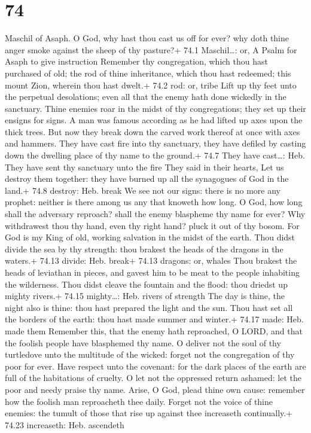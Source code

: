 \hypertarget{section-73}{%
\section{74}\label{section-73}}

Maschil of Asaph.  O God, why hast thou cast us off for
ever? why doth thine anger smoke against the sheep of thy pasture?+ 74.1
Maschil\ldots: or, A Psalm for Asaph to give instruction 
Remember thy congregation, which thou hast purchased of old; the rod of
thine inheritance, which thou hast redeemed; this mount Zion, wherein
thou hast dwelt.+ 74.2 rod: or, tribe  Lift up thy feet unto
the perpetual desolations; even all that the enemy hath done wickedly in
the sanctuary.  Thine enemies roar in the midst of thy
congregations; they set up their ensigns for signs.  A man
was famous according as he had lifted up axes upon the thick trees.
 But now they break down the carved work thereof at once
with axes and hammers.  They have cast fire into thy
sanctuary, they have defiled by casting down the dwelling place of thy
name to the ground.+ 74.7 They have cast\ldots: Heb. They have sent thy
sanctuary unto the fire  They said in their hearts, Let us
destroy them together: they have burned up all the synagogues of God in
the land.+ 74.8 destroy: Heb. break  We see not our signs:
there is no more any prophet: neither is there among us any that knoweth
how long.  O God, how long shall the adversary reproach?
shall the enemy blaspheme thy name for ever?  Why
withdrawest thou thy hand, even thy right hand? pluck it out of thy
bosom.  For God is my King of old, working salvation in the
midst of the earth.  Thou didst divide the sea by thy
strength: thou brakest the heads of the dragons in the waters.+ 74.13
divide: Heb. break+ 74.13 dragons: or, whales  Thou brakest
the heads of leviathan in pieces, and gavest him to be meat to the
people inhabiting the wilderness.  Thou didst cleave the
fountain and the flood: thou driedst up mighty rivers.+ 74.15
mighty\ldots: Heb. rivers of strength  The day is thine,
the night also is thine: thou hast prepared the light and the sun.
 Thou hast set all the borders of the earth: thou hast made
summer and winter.+ 74.17 made: Heb. made them  Remember
this, that the enemy hath reproached, O LORD, and that the foolish
people have blasphemed thy name.  O deliver not the soul of
thy turtledove unto the multitude of the wicked: forget not the
congregation of thy poor for ever.  Have respect unto the
covenant: for the dark places of the earth are full of the habitations
of cruelty.  O let not the oppressed return ashamed: let
the poor and needy praise thy name.  Arise, O God, plead
thine own cause: remember how the foolish man reproacheth thee daily.
 Forget not the voice of thine enemies: the tumult of those
that rise up against thee increaseth continually.+ 74.23 increaseth:
Heb. ascendeth

